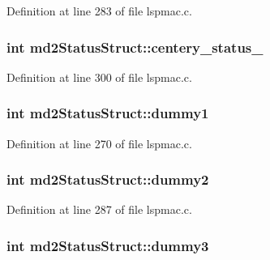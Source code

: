 Definition at line 283 of file lspmac.\-c.

\hypertarget{structmd2StatusStruct_aa242098c185cce8f852cd6e081ef0b1d}{
\subsubsection[{centery\-\_\-status\-\_\-2}]{\setlength{\rightskip}{0pt plus 5cm}int md2\-Status\-Struct\-::centery\-\_\-status\-\_}}\label{structmd2StatusStruct_aa242098c185cce8f852cd6e081ef0b1d}


Definition at line 300 of file lspmac.\-c.

\hypertarget{structmd2StatusStruct_a3a2dff3e6a1a346806a655e8404e0f53}{
\subsubsection[{dummy1}]{\setlength{\rightskip}{0pt plus 5cm}int md2\-Status\-Struct\-::dummy1}}\label{structmd2StatusStruct_a3a2dff3e6a1a346806a655e8404e0f53}


Definition at line 270 of file lspmac.\-c.

\hypertarget{structmd2StatusStruct_a4df936acc498498baba111edb82597a1}{
\subsubsection[{dummy2}]{\setlength{\rightskip}{0pt plus 5cm}int md2\-Status\-Struct\-::dummy2}}\label{structmd2StatusStruct_a4df936acc498498baba111edb82597a1}


Definition at line 287 of file lspmac.\-c.

\hypertarget{structmd2StatusStruct_adb2dc5bdbf99def51018558201508009}{
\subsubsection[{dummy3}]{\setlength{\rightskip}{0pt plus 5cm}int md2\-Status\-Struct\-::dummy3}}\label{structmd2StatusStruct_adb2dc5bdbf99def51018558201508009}


